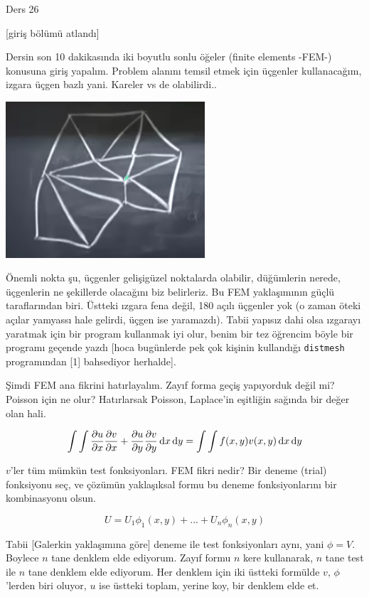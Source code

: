 \documentclass[12pt,fleqn]{article}\usepackage{../../common}
\begin{document}
Ders 26

[giriş bölümü atlandı]

Dersin son 10 dakikasında iki boyutlu sonlu öğeler (finite elements -FEM-)
konusuna giriş yapalım. Problem alanını temsil etmek için üçgenler kullanacağım,
izgara üçgen bazlı yani. Kareler vs de olabilirdi..

\includegraphics[width=20em]{compscieng_1_26_01.png}

Önemli nokta şu, üçgenler gelişigüzel noktalarda olabilir, düğümlerin nerede,
üçgenlerin ne şekillerde olacağını biz belirleriz. Bu FEM yaklaşımının güçlü
taraflarından biri. Üstteki ızgara fena değil, 180 açılı üçgenler yok (o zaman
öteki açılar yamyassı hale gelirdi, üçgen ise yaramazdı). Tabii yapısız dahi
olsa ızgarayı yaratmak için bir program kullanmak iyi olur, benim bir
tez öğrencim böyle bir programı geçende yazdı [hoca bugünlerde pek çok kişinin
kullandığı \verb!distmesh! programından [1] bahsediyor herhalde]. 

Şimdi FEM ana fikrini hatırlayalım. Zayıf forma geçiş yapıyorduk değil mi?
Poisson için ne olur? Hatırlarsak Poisson, Laplace'in eşitliğin sağında bir
değer olan hali.

$$
\int \int
\frac{\partial u}{\partial x} \frac{\partial v}{\partial x} +
\frac{\partial u}{\partial y} \frac{\partial v}{\partial y}
\,\mathrm{d} x \,\mathrm{d} y =
\int \int f(x,y) v(x,y) \,\mathrm{d} x \,\mathrm{d} y 
$$

$v$'ler tüm mümkün test fonksiyonları. FEM fikri nedir? Bir deneme (trial)
fonksiyonu seç, ve çözümün yaklaşıksal formu bu deneme fonksiyonlarını bir
kombinasyonu olsun.

$$
U = U_1 \phi_1(x,y) + ... + U_n \phi_n(x,y) 
$$

Tabii [Galerkin yaklaşımına göre] deneme ile test fonksiyonları aynı, yani
$\phi = V$. Boylece $n$ tane denklem elde ediyorum. Zayıf formu $n$ kere kullanarak,
$n$ tane test ile $n$ tane denklem elde ediyorum. Her denklem için iki üstteki
formülde $v$, $\phi$'lerden biri oluyor, $u$ ise üstteki toplam, yerine koy,
bir denklem elde et.
\end{document}
